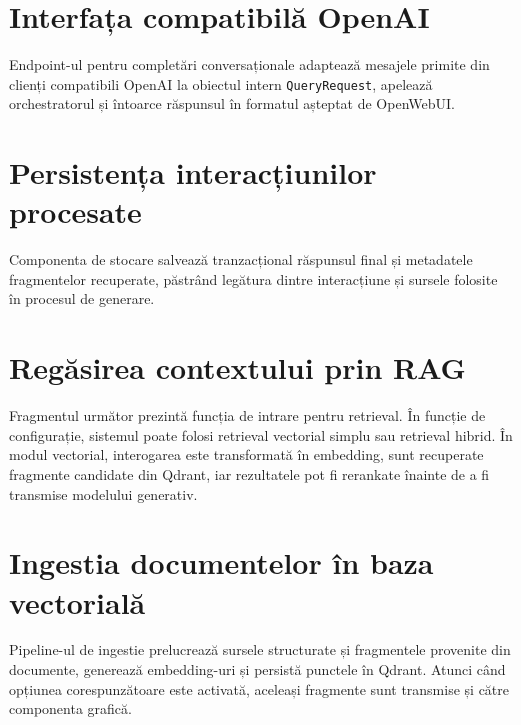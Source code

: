 \documentclass[12pt, a4paper, oneside, romanian]{teza-upb}
\begin{document}
\label{anexa:llm-routing}


\section{Interfața compatibilă OpenAI}

Endpoint-ul pentru completări conversaționale adaptează mesajele primite din clienți compatibili OpenAI la obiectul intern \texttt{QueryRequest}, apelează orchestratorul și întoarce răspunsul în formatul așteptat de OpenWebUI.

\label{anexa:openai-compatible-endpoint}


\section{Persistența interacțiunilor procesate}

Componenta de stocare salvează tranzacțional răspunsul final și metadatele fragmentelor recuperate, păstrând legătura dintre interacțiune și sursele folosite în procesul de generare.

\label{anexa:sqlite-interaction-store}


\section{Regăsirea contextului prin RAG}

Fragmentul următor prezintă funcția de intrare pentru retrieval. În funcție de configurație, sistemul poate folosi retrieval vectorial simplu sau retrieval hibrid. În modul vectorial, interogarea este transformată în embedding, sunt recuperate fragmente candidate din Qdrant, iar rezultatele pot fi rerankate înainte de a fi transmise modelului generativ.

\label{anexa:retrieval-dispatch}


\section{Ingestia documentelor în baza vectorială}

Pipeline-ul de ingestie prelucrează sursele structurate și fragmentele provenite din documente, generează embedding-uri și persistă punctele în Qdrant. Atunci când opțiunea corespunzătoare este activată, aceleași fragmente sunt transmise și către componenta grafică.
\end{document}
